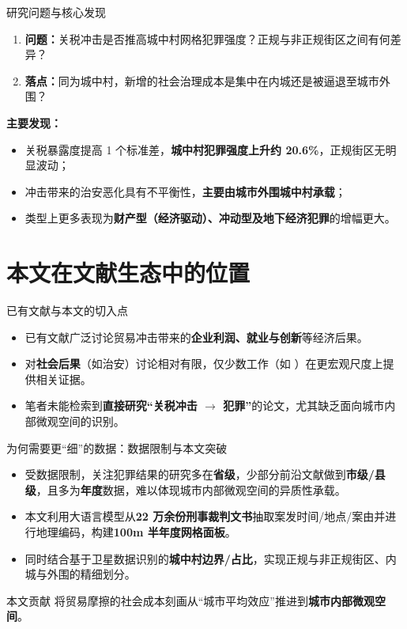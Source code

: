 \documentclass[aspectratio=169,10pt]{ctexbeamer}
\begin{document}
\begin{frame}{研究问题与核心发现}
  \begin{enumerate}
    \item \textbf{问题：}关税冲击是否推高城中村网格犯罪强度？正规与非正规街区之间有何差异？
    \item \textbf{落点：}同为城中村，新增的社会治理成本是集中在内城还是被逼退至城市外围？
  \end{enumerate}
  \vspace{0.6em}
  \textbf{主要发现：}
  \begin{itemize}
    \item 关税暴露度提高 1 个标准差，\textbf{城中村犯罪强度上升约 20.6\%}，正规街区无明显波动；
    \item 冲击带来的治安恶化具有不平衡性，\textbf{主要由城市外围城中村承载}；
    \item 类型上更多表现为\textbf{财产型（经济驱动）、冲动型及地下经济犯罪}的增幅更大。
  \end{itemize}
\end{frame}

\section{本文在文献生态中的位置}

\begin{frame}{已有文献与本文的切入点}
  \begin{itemize}
    \item 已有文献广泛讨论贸易冲击带来的\textbf{企业利润、就业与创新}等经济后果\citep{amiti2019impact,fajgelbaum2020return,ma2025market}。
    \item 对\textbf{社会后果}（如治安）讨论相对有限，仅少数工作（如 \citeauthor{ma2025market}\citeyearpar{ma2025market}）在更宏观尺度上提供相关证据。
    \item 笔者未能检索到\textbf{直接研究“关税冲击 $\rightarrow$ 犯罪”}的论文，尤其缺乏面向城市内部微观空间的识别。
  \end{itemize}
\end{frame}

\begin{frame}{为何需要更“细”的数据：数据限制与本文突破}
  \begin{itemize}
    \item 受数据限制，关注犯罪结果的研究多在\textbf{省级}，少部分前沿文献做到\textbf{市级/县级}，且多为\textbf{年度}数据，难以体现城市内部微观空间的异质性承载。
    \item 本文利用大语言模型从\textbf{22 万余份刑事裁判文书}抽取案发时间/地点/案由并进行地理编码，构建\textbf{100m 半年度网格面板}。
    \item 同时结合基于卫星数据识别的\textbf{城中村边界/占比}，实现正规与非正规街区、内城与外围的精细划分。
  \end{itemize}
  \vspace{0.4em}
  \begin{block}{本文贡献}
    将贸易摩擦的社会成本刻画从“城市平均效应”推进到\textbf{城市内部微观空间}。
  \end{block}
\end{frame}
\end{document}
